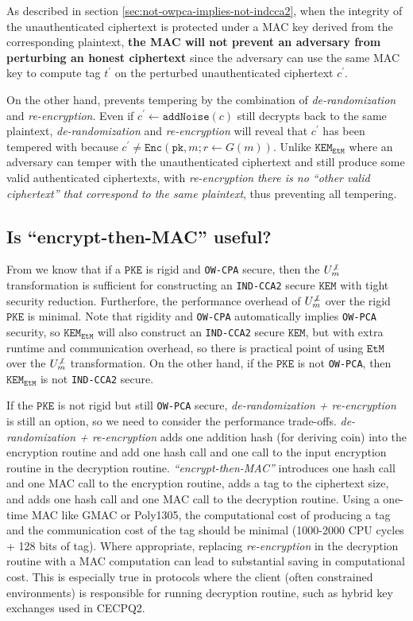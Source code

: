 \documentclass[floatrow,journal=tches,submission]{iacrtrans}
\newcommand{\monospace}{\texttt}
\newcommand{\pke}{\monospace{PKE}}
\newcommand{\encrypt}{\monospace{Enc}}
\newcommand{\kem}{\monospace{KEM}}
\newcommand{\etm}{\monospace{EtM}}  %
\newcommand{\pk}{\monospace{pk}}
\begin{document}
As described in section \ref{sec:not-owpca-implies-not-indcca2}, when the integrity of the unauthenticated ciphertext is protected under a MAC key derived from the corresponding plaintext, \textbf{the MAC will not prevent an adversary from perturbing an honest ciphertext} since the adversary can use the same MAC key to compute tag $t^\prime$ on the perturbed unauthenticated ciphertext $c^\prime$.

On the other hand, \cite{hofheinz2017modular} prevents tempering by the combination of \emph{de-randomization} and \emph{re-encryption}. Even if $c^\prime \leftarrow \monospace{addNoise}(c)$ still decrypts back to the same plaintext, \emph{de-randomization} and \emph{re-encryption} will reveal that $c^\prime$ has been tempered with because $c^\prime \neq \encrypt(\pk, m; r\leftarrow G(m))$. Unlike $\kem_\etm$ where an adversary can temper with the unauthenticated ciphertext and still produce some valid authenticated ciphertexts, with \emph{re-encryption} \emph{there is no ``other valid ciphertext'' that correspond to the same plaintext}, thus preventing all tempering.

\subsection{Is ``encrypt-then-MAC'' useful?}
From \cite{hofheinz2017modular} we know that if a $\pke$ is rigid and \monospace{OW-CPA} secure, then the $U^{\not\bot}_m$ transformation is sufficient for constructing an \monospace{IND-CCA2} secure $\kem$ with tight security reduction. Furtherfore, the performance overhead of $U^{\not\bot}_m$ over the rigid $\pke$ is minimal. Note that rigidity and \monospace{OW-CPA} automatically implies \monospace{OW-PCA} security, so $\kem_\etm$ will also construct an \monospace{IND-CCA2} secure $\kem$, but with extra runtime and communication overhead, so there is practical point of using $\etm$ over the $U^{\not\bot}_m$ transformation. On the other hand, if the $\pke$ is not \monospace{OW-PCA}, then $\kem_\etm$ is not \monospace{IND-CCA2} secure.

If the $\pke$ is not rigid but still \monospace{OW-PCA} secure, \emph{de-randomization + re-encryption} is still an option, so we need to consider the performance trade-offs. \emph{de-randomization + re-encryption} adds one addition hash (for deriving coin) into the encryption routine and add one hash call and one call to the input encryption routine in the decryption routine. \emph{``encrypt-then-MAC''} introduces one hash call and one MAC call to the encryption routine, adds a tag to the ciphertext size, and adds one hash call and one MAC call to the decryption routine. Using a one-time MAC like GMAC or Poly1305, the computational cost of producing a tag and the communication cost of the tag should be minimal (1000-2000 CPU cycles + 128 bits of tag). Where appropriate, replacing \emph{re-encryption} in the decryption routine with a MAC computation can lead to substantial saving in computational cost. This is especially true in protocols where the client (often constrained environments) is responsible for running decryption routine, such as hybrid key exchanges used in CECPQ2.
\end{document}
